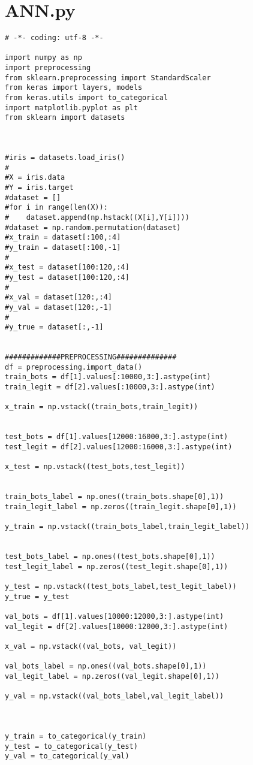 \section{ANN.py}
\begin{lstlisting}
# -*- coding: utf-8 -*-

import numpy as np
import preprocessing
from sklearn.preprocessing import StandardScaler
from keras import layers, models
from keras.utils import to_categorical
import matplotlib.pyplot as plt
from sklearn import datasets



#iris = datasets.load_iris()
#
#X = iris.data
#Y = iris.target
#dataset = []
#for i in range(len(X)):
#    dataset.append(np.hstack((X[i],Y[i])))
#dataset = np.random.permutation(dataset)
#x_train = dataset[:100,:4]
#y_train = dataset[:100,-1]
#
#x_test = dataset[100:120,:4]
#y_test = dataset[100:120,:4]
#
#x_val = dataset[120:,:4]
#y_val = dataset[120:,-1]
#
#y_true = dataset[:,-1]


#############PREPROCESSING##############
df = preprocessing.import_data()
train_bots = df[1].values[:10000,3:].astype(int)
train_legit = df[2].values[:10000,3:].astype(int)

x_train = np.vstack((train_bots,train_legit))


test_bots = df[1].values[12000:16000,3:].astype(int)
test_legit = df[2].values[12000:16000,3:].astype(int)

x_test = np.vstack((test_bots,test_legit))


train_bots_label = np.ones((train_bots.shape[0],1))
train_legit_label = np.zeros((train_legit.shape[0],1))

y_train = np.vstack((train_bots_label,train_legit_label))


test_bots_label = np.ones((test_bots.shape[0],1))
test_legit_label = np.zeros((test_legit.shape[0],1))

y_test = np.vstack((test_bots_label,test_legit_label))
y_true = y_test

val_bots = df[1].values[10000:12000,3:].astype(int)
val_legit = df[2].values[10000:12000,3:].astype(int)

x_val = np.vstack((val_bots, val_legit))

val_bots_label = np.ones((val_bots.shape[0],1))
val_legit_label = np.zeros((val_legit.shape[0],1))

y_val = np.vstack((val_bots_label,val_legit_label))



y_train = to_categorical(y_train)
y_test = to_categorical(y_test)
y_val = to_categorical(y_val)


\end{lstlisting}
